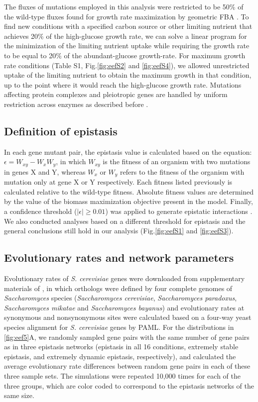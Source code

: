 \documentclass[10pt]{article}
\newcommand{\Figs}{Fig.} %
\newcommand{\citep}{\cite}
\newcommand{\citet}{\citep}
\begin{document}
The fluxes of mutations employed in this analysis were restricted to
be 50\% of the wild-type fluxes found for growth rate maximization by
geometric FBA \citep{He2010}. To find new conditions with a specified carbon
source or other limiting nutrient that achieves 20\% of the
high-glucose growth rate, we can solve a linear program for the
minimization of the limiting nutrient uptake while requiring the
growth rate to be equal to 20\% of the abundant-glucose
growth-rate. For maximum growth rate conditions (Table S1, \Figs \ref{fig:eefS2}
and \ref{fig:eefS4}), we allowed unrestricted uptake of the limiting nutrient to
obtain the maximum growth in that condition, up to the point where it
would reach the high-glucose growth rate. Mutations affecting protein
complexes and pleiotropic genes are handled by uniform restriction
across enzymes as described before \citep{Xu2012}.

\subsection*{Definition of epistasis}

In each gene mutant pair, the epistasis value is calculated based on
the equation: $\epsilon = W_{xy} - W_xW_y$, in which $W_{xy}$ is the
fitness of an organism with two mutations in genes X and Y, whereas
$W_{x}$ or $W_{y}$ refers to the fitness of the organism with mutation
only at gene X or Y respectively. Each fitness listed previously is
calculated relative to the wild-type fitness. Absolute fitness values
are determined by the value of the biomass maximization objective
present in the model. Finally, a confidence threshold
($\left|\epsilon\right| \geq 0.01$) was applied to generate epistatic
interactions \citep{Xu2012, Costanzo2010, He2010}. We also conducted
analyses based on a different threshold for epistasis and the general
conclusions still hold in our analysis (\Figs \ref{fig:eefS1} and
\ref{fig:eefS3}).

\subsection*{Evolutionary rates and network parameters}

Evolutionary rates of \textit{S. cerevisiae} genes were downloaded
from supplementary materials of \citet{Wall2005}, in which orthologs were
defined by four complete genomes of \textit{Saccharomyces} species
(\textit{Saccharomyces cerevisiae}, \textit{Saccharomyces paradoxus},
\textit{Saccharomyces mikatae} and \textit{Saccharomyces bayanus}) and
evolutionary rates at synonymous and nonsynonymous sites were
calculated based on a four-way yeast species alignment for
\textit{S. cerevisiae} genes by PAML. For the distributions in
\ref{fig:eef5}A, we randomly sampled gene pairs with the same number
of gene pairs
as in three epistasis networks (epistasis in all 16 conditions,
extremely stable epistasis, and extremely dynamic epistasis,
respectively), and calculated the average evolutionary rate
differences between random gene pairs in each of these three sample
sets. The simulations were repeated 10,000 times for each of the three
groups, which are color coded to correspond to the epistasis networks
of the same size.
\end{document}
